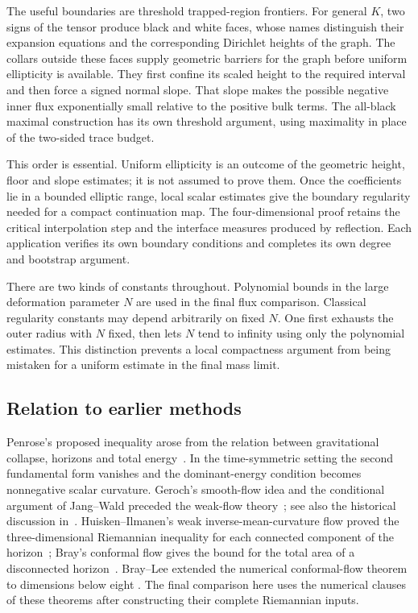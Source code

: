 The useful boundaries are threshold trapped-region frontiers.  For
general $K$, two signs of the tensor produce black and white faces,
whose names distinguish their expansion equations and the corresponding
Dirichlet heights of the graph.  The collars outside these faces supply
geometric barriers for the graph before uniform ellipticity is available.
They first confine its scaled height to the required interval and then
force a signed normal slope.  That slope makes the possible negative
inner flux exponentially small relative to the positive bulk terms.
The all-black maximal construction has its own threshold argument,
using maximality in place of the two-sided trace budget.

This order is essential.  Uniform ellipticity is an outcome of the
geometric height, floor and slope estimates; it is not assumed to prove
them.  Once the coefficients lie in a bounded elliptic range, local
scalar estimates give the boundary regularity needed for a compact
continuation map.  The four-dimensional proof retains the critical
interpolation step and the interface measures produced by reflection.
Each application verifies its own boundary conditions and completes
its own degree and bootstrap argument.

There are two kinds of constants throughout.  Polynomial bounds in the
large deformation parameter $N$ are used in the final flux comparison.
Classical regularity constants may depend arbitrarily on fixed $N$.
One first exhausts the outer radius with $N$ fixed, then lets $N$ tend
to infinity using only the polynomial estimates.  This distinction
prevents a local compactness argument from being mistaken for a
uniform estimate in the final mass limit.

\subsection{Relation to earlier methods}

Penrose's proposed inequality arose from the relation between gravitational
collapse, horizons and total energy~\cite{Penrose1973}.  In the
time-symmetric setting the second fundamental form vanishes and the
dominant-energy condition becomes nonnegative scalar curvature.
Geroch's smooth-flow idea and the conditional argument of Jang--Wald
preceded the weak-flow theory~\cite{Geroch1973,JangWald1977}; see also
the historical discussion in~\cite[p.~359]{HuiskenIlmanen2001}.
Huisken--Ilmanen's weak inverse-mean-curvature flow proved the
three-dimensional Riemannian inequality for each connected component
of the horizon~\cite[Main Theorem, p.~356]{HuiskenIlmanen2001};
Bray's conformal flow gives the bound for the total area of a disconnected
horizon~\cite[Theorems~1 and~19]{Bray2001}.  Bray--Lee extended the numerical
conformal-flow theorem to dimensions below eight
\cite[Theorem~1.4]{BrayLee2009}.  The final comparison
here uses the numerical clauses of these theorems after constructing
their complete Riemannian inputs.

